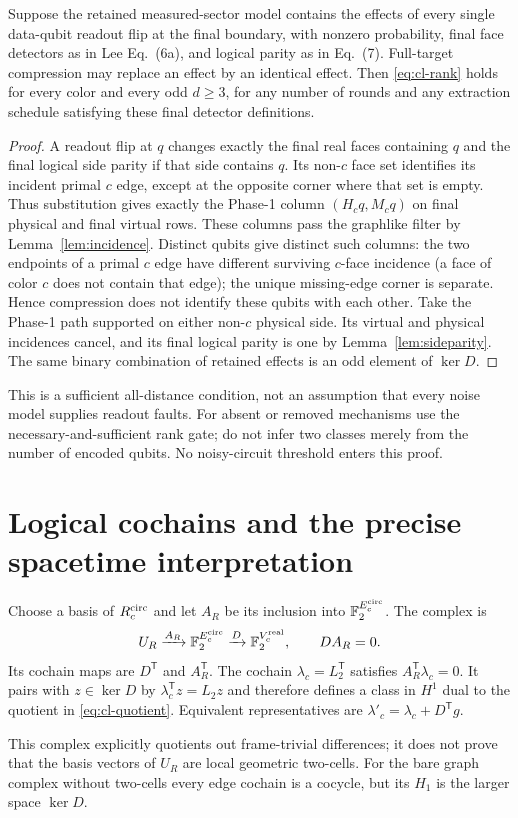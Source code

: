 \begin{proposition}
\label{prop:cl-memory}
Suppose the retained measured-sector model contains the effects of every
single data-qubit readout flip at the final boundary, with nonzero
probability, final face detectors as in Lee Eq.\ (6a), and logical parity
as in Eq.\ (7). Full-target compression may replace an effect by an
identical effect. Then \eqref{eq:cl-rank} holds for every color and every
odd $d\ge3$, for any number of rounds and any extraction schedule satisfying
these final detector definitions.
\end{proposition}
\begin{proof}
A readout flip at $q$ changes exactly the final real faces containing $q$
and the final logical side parity if that side contains $q$.
Its non-$c$ face set identifies its incident primal $c$ edge, except at
the opposite corner where that set is empty. Thus substitution gives
exactly the Phase-1 column $(H_cq,M_cq)$ on final physical and final
virtual rows. These columns pass the graphlike filter by
Lemma~\ref{lem:incidence}. Distinct qubits give distinct such columns:
the two endpoints of a primal $c$ edge have different surviving $c$-face
incidence (a face of color $c$ does not contain that edge); the unique
missing-edge corner is separate. Hence compression does not identify
these qubits with each other. Take the Phase-1 path supported on either
non-$c$ physical side. Its virtual and physical incidences cancel, and
its final logical parity is one by Lemma~\ref{lem:sideparity}. The same
binary combination of retained effects is an odd element of $\ker D$.
\end{proof}
This is a sufficient all-distance condition, not an assumption that every
noise model supplies readout faults. For absent or removed mechanisms use
the necessary-and-sufficient rank gate; do not infer two classes merely
from the number of encoded qubits. No noisy-circuit threshold enters this
proof.

\section{Logical cochains and the precise spacetime interpretation}
\label{sec:cl-geometry}
\begin{definition}
\label{def:cl-complex}
Choose a basis of $R_c^{\rm circ}$ and let $A_R$ be its inclusion into
$\mathbb F_2^{E_c^{\rm circ}}$. The complex is
\[
 U_R\xrightarrow{A_R}\mathbb F_2^{E_c^{\rm circ}}\xrightarrow{D}\mathbb F_2^{V_c^{\rm real}},
 \qquad DA_R=0.
\]
Its cochain maps are $D^{\mathsf T}$ and $A_R^{\mathsf T}$. The cochain
$\lambda_c=L_2^{\mathsf T}$ satisfies $A_R^{\mathsf T}\lambda_c=0$.
It pairs with $z\in\ker D$ by $\lambda_c^{\mathsf T}z=L_2z$ and
therefore defines a class in $H^1$ dual to the quotient in
\eqref{eq:cl-quotient}. Equivalent representatives are
$\lambda'_c=\lambda_c+D^{\mathsf T}g$.
\end{definition}
This complex explicitly quotients out frame-trivial differences; it does
not prove that the basis vectors of $U_R$ are local geometric two-cells.
For the bare graph complex without two-cells every edge cochain is a
cocycle, but its $H_1$ is the larger space $\ker D$.

